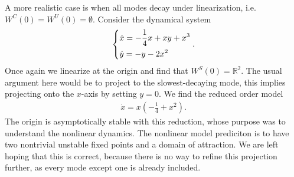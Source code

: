 \begin{ex}[]
	A more realistic case is when all modes decay under linearization, i.e. $W^{C}(0) = W^{U}(0) = \emptyset$. Consider the dynamical system
	\begin{align}
		\begin{dcases}
			\dot{x} = -\frac{1}{4}x + xy + x^{3} \\
			\dot{y} = -y - 2x^{2}
		\end{dcases}
.		
	\end{align}
	Once again we linearize at the origin and find that $W^{S}(0) = \mathbb{R}^{2}$. The usual argument here would be to project to the slowest-decaying mode, this implies projecting onto the $x$-axis by setting $y=0$. We find the reduced order model
	\begin{align}
		\dot{x} = x\left( - \frac{1}{4} + x^{2}\right).
	\end{align}
	The origin is asymptotically stable with this reduction, whose purpose was to understand the nonlinear dynamics. The nonlinear model prediciton is to have two nontrivial unstable fixed points and a domain of attraction. We are left hoping that this is correct, because there is no way to refine this projection further, as every mode except one is already included.


\end{ex}
